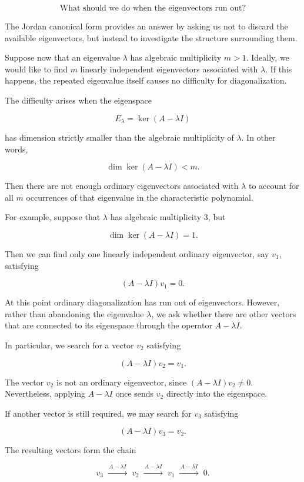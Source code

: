 \documentclass[11pt]{article}
\begin{document}
\[
\boxed{
\text{What should we do when the eigenvectors run out?}
}
\]

The Jordan canonical form provides an answer by asking us not to
discard the available eigenvectors, but instead to investigate the
structure surrounding them.

Suppose now that an eigenvalue \(\lambda\) has algebraic multiplicity
\(m>1\).  Ideally, we would like to find \(m\) linearly independent
eigenvectors associated with \(\lambda\).  If this happens, the repeated
eigenvalue itself causes no difficulty for diagonalization.

The difficulty arises when the eigenspace

\[
E_\lambda=\ker(A-\lambda I)
\]

has dimension strictly smaller than the algebraic multiplicity of
\(\lambda\).  In other words,

\[
\dim\ker(A-\lambda I)<m.
\]

Then there are not enough ordinary eigenvectors associated with
\(\lambda\) to account for all \(m\) occurrences of that eigenvalue in
the characteristic polynomial.

For example, suppose that \(\lambda\) has algebraic multiplicity \(3\),
but

\[
\dim\ker(A-\lambda I)=1.
\]

Then we can find only one linearly independent ordinary eigenvector,
say \(v_1\), satisfying

\[
(A-\lambda I)v_1=0.
\]

At this point ordinary diagonalization has run out of eigenvectors.
However, rather than abandoning the eigenvalue \(\lambda\), we ask
whether there are other vectors that are connected to its eigenspace
through the operator \(A-\lambda I\).

In particular, we search for a vector \(v_2\) satisfying

\[
(A-\lambda I)v_2=v_1.
\]

The vector \(v_2\) is not an ordinary eigenvector, since
\((A-\lambda I)v_2\neq 0\).  Nevertheless, applying
\(A-\lambda I\) once sends \(v_2\) directly into the eigenspace.

If another vector is still required, we may search for \(v_3\)
satisfying

\[
(A-\lambda I)v_3=v_2.
\]

The resulting vectors form the chain

\[
v_3
\;\xrightarrow{\,A-\lambda I\,}\;
v_2
\;\xrightarrow{\,A-\lambda I\,}\;
v_1
\;\xrightarrow{\,A-\lambda I\,}\;
0.
\]
\end{document}
